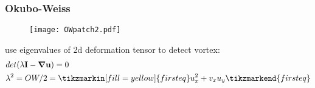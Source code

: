 \documentclass{beamer}
\begin{document}
\begin{frame}
	\frametitle{Okubo-Weiss}
	\centering
	\begin{minipage}[T]{1\textwidth}
	\begin{figure}
		\texttt{[image: OWpatch2.pdf]}
	\end{figure}		
	\end{minipage}
\vfill
	\begin{minipage}[T]{1\textwidth}
		use eigenvalues of 2d deformation tensor to detect vortex: 
\begin{align*}
& det(\lambda\vec{I}- \vec{\grad \vec{u}}) =0\\
&\lambda^{2} =OW/2=\tikzmarkin[fill=yellow]{first eq}u_{x}^{2} + v_{x}u_{y}\tikzmarkend{first eq} \\
\end{align*}		
\end{minipage}
\end{frame}







\end{document}
